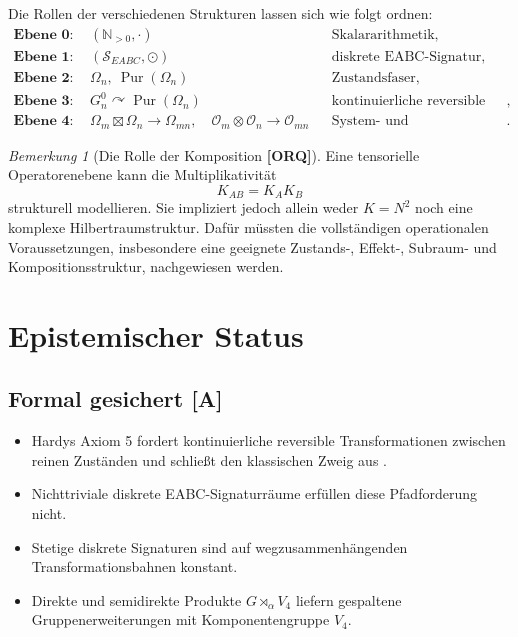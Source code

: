 \documentclass[11pt,a4paper,reqno]{amsart}
\theoremstyle{definition}
\theoremstyle{remark}
\newtheorem{remark}[theorem]{Bemerkung}
\newcommand{\N}{\mathbb{N}}
\newcommand{\Pur}{\operatorname{Pur}}
\newcommand{\SEABC}{\mathcal{S}_{EABC}}
\newcommand{\StatusA}{\textnormal{\textbf{[A]}}}
\newcommand{\StatusORQ}{\textnormal{\textbf{[ORQ]}}}
\begin{document}
Die Rollen der verschiedenen Strukturen lassen sich wie folgt ordnen:
\begin{align}
\textbf{Ebene 0:}\quad
& (\N_{>0},\cdot)
&& \text{Skalararithmetik},
\\
\textbf{Ebene 1:}\quad
& (\SEABC,\odot)
&& \text{diskrete EABC-Signatur},
\\
\textbf{Ebene 2:}\quad
& \Omega_n,\ \Pur(\Omega_n)
&& \text{Zustandsfaser},
\\
\textbf{Ebene 3:}\quad
& G_n^0\curvearrowright\Pur(\Omega_n)
&& \text{kontinuierliche reversible Dynamik},
\\
\textbf{Ebene 4:}\quad
& \Omega_m\boxtimes\Omega_n\longrightarrow\Omega_{mn},
\quad
\mathcal O_m\otimes\mathcal O_n\longrightarrow\mathcal O_{mn}
&& \text{System- und Operatorkomposition}.
\end{align}

\begin{remark}[Die Rolle der Komposition \StatusORQ]
Eine tensorielle Operatorenebene kann die Multiplikativität
\[
K_{AB}=K_AK_B
\]
strukturell modellieren. Sie impliziert jedoch allein weder $K=N^2$ noch eine komplexe Hilbertraumstruktur. Dafür müssten die vollständigen operationalen Voraussetzungen, insbesondere eine geeignete Zustands-, Effekt-, Subraum- und Kompositionsstruktur, nachgewiesen werden.
\end{remark}

\section{Epistemischer Status}

\subsection*{Formal gesichert \StatusA}
\begin{itemize}[leftmargin=2.2em]
  \item Hardys Axiom 5 fordert kontinuierliche reversible Transformationen zwischen reinen Zuständen und schließt den klassischen Zweig aus \cite{Hardy2001}.
  \item Nichttriviale diskrete EABC-Signaturräume erfüllen diese Pfadforderung nicht.
  \item Stetige diskrete Signaturen sind auf wegzusammenhängenden Transformationsbahnen konstant.
  \item Direkte und semidirekte Produkte $G\rtimes_\alpha V_4$ liefern gespaltene Gruppenerweiterungen mit Komponentengruppe $V_4$.
\end{itemize}
\end{document}
